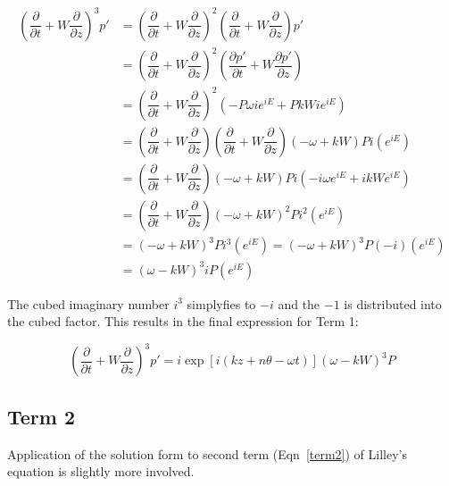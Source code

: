 \documentclass[]{aiaa-tc}%
\begin{document}
\begin{align*}
\left( \dfrac{\partial}{\partial t} + W \dfrac{\partial}{\partial z} \right)^3 p'
&= \left( \dfrac{\partial}{\partial t} + W \dfrac{\partial}{\partial z}
   \right)^2
   \left( \dfrac{\partial}{\partial t} + W \dfrac{\partial}{\partial z}
   \right)p' \\
&= \left( \dfrac{\partial}{\partial t} + W \dfrac{\partial}{\partial z}
   \right)^2
   \left( \dfrac{\partial p'}{\partial t} + W \dfrac{\partial p'}{\partial z}
   \right) \\
&= \left( \dfrac{\partial}{\partial t} + W \dfrac{\partial}{\partial z}
   \right)^2
   \left( -P\omega ie^{iE} + PkW ie^{iE}
   \right) \\
&= \left( \dfrac{\partial}{\partial t} + W \dfrac{\partial}{\partial z}
   \right)
   \left( \dfrac{\partial}{\partial t} + W \dfrac{\partial}{\partial z}
   \right) (-\omega + kW)P i (e^{iE}) \\
&= \left( \dfrac{\partial}{\partial t} + W \dfrac{\partial}{\partial z}
   \right) (-\omega + kW)P i
   (-i\omega e^{iE} + ikW e^{iE}) \\
&= \left( \dfrac{\partial}{\partial t} + W \dfrac{\partial}{\partial z}
   \right) (-\omega + kW)^2 P i^2 (e^{iE}) \\
&= (-\omega + kW)^3 P i^3(e^{iE}) = (-\omega + kW)^3P(-i) (e^{iE}) \\
&= (\omega - kW)^3iP (e^{iE})
\end{align*}

The cubed imaginary number $i^3$ simplyfies to $-i$ and the $-1$ is distributed into the cubed factor.  This results in the final expression for Term 1:

\begin{equation} \label{term1soln}
\boxed{ \left( \dfrac{\partial}{\partial t}
          + W \dfrac{\partial}{\partial z} \right)^3 p'
    =  i\exp[i(kz + n\theta -\omega t)] (\omega - kW)^3 P}
\end{equation}





\clearpage
\subsection{Term 2}

Application of the solution form to second term (Eqn~\ref{term2}) of Lilley's equation is slightly more involved.
\end{document}
